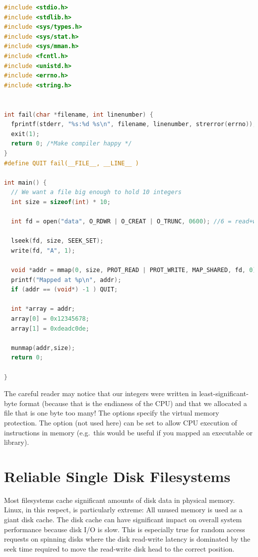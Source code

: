 \begin{lstlisting}[language=C]
#include <stdio.h>
#include <stdlib.h>
#include <sys/types.h>
#include <sys/stat.h>
#include <sys/mman.h>
#include <fcntl.h>
#include <unistd.h>
#include <errno.h>
#include <string.h>


int fail(char *filename, int linenumber) {
  fprintf(stderr, "%s:%d %s\n", filename, linenumber, strerror(errno));
  exit(1);
  return 0; /*Make compiler happy */
}
#define QUIT fail(__FILE__, __LINE__ )

int main() {
  // We want a file big enough to hold 10 integers
  int size = sizeof(int) * 10;

  int fd = open("data", O_RDWR | O_CREAT | O_TRUNC, 0600); //6 = read+write for me!

  lseek(fd, size, SEEK_SET);
  write(fd, "A", 1);

  void *addr = mmap(0, size, PROT_READ | PROT_WRITE, MAP_SHARED, fd, 0);
  printf("Mapped at %p\n", addr);
  if (addr == (void*) -1 ) QUIT;

  int *array = addr;
  array[0] = 0x12345678;
  array[1] = 0xdeadc0de;

  munmap(addr,size);
  return 0;

}
\end{lstlisting}

The careful reader may notice that our integers were written in least-significant-byte format (because that is the endianess of the CPU) and that we allocated a file that is one byte too many! The  options specify the virtual memory protection. The option  (not used here) can be set to allow CPU execution of instructions in memory (e.g.~this would be useful if you mapped an executable or library).

\section{Reliable Single Disk Filesystems}\label{reliable-single-disk-filesystems}

Most filesystems cache significant amounts of disk data in physical memory. Linux, in this respect, is particularly extreme: All unused memory is used as a giant disk cache. The disk cache can have significant impact on overall system performance because disk I/O is slow. This is especially true for random access requests on spinning disks where the disk read-write latency is dominated by the seek time required to move the read-write disk head to the correct position.

